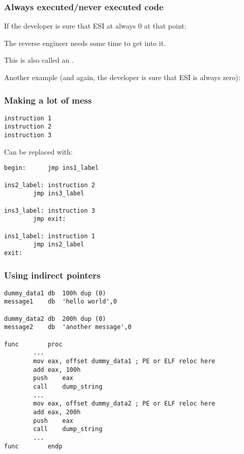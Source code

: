 \subsubsection{Always executed/never executed code}

If the developer is sure that ESI 
at always 0 at that point:



The reverse engineer needs some time to get into it.

This is also called an .

Another example (and again, the developer is sure that ESI is always zero):



\subsubsection{Making a lot of mess}

\begin{lstlisting}
instruction 1
instruction 2
instruction 3
\end{lstlisting}

Can be replaced with:

\begin{lstlisting}
begin:		jmp	ins1_label

ins2_label:	instruction 2
		jmp	ins3_label

ins3_label:	instruction 3
		jmp	exit:

ins1_label:	instruction 1
		jmp	ins2_label
exit:
\end{lstlisting}

\subsubsection{Using indirect pointers}

\begin{lstlisting}
dummy_data1	db	100h dup (0)
message1	db	'hello world',0

dummy_data2	db	200h dup (0)
message2	db	'another message',0

func		proc
		...
		mov	eax, offset dummy_data1 ; PE or ELF reloc here
		add	eax, 100h
		push	eax
		call	dump_string
		...
		mov	eax, offset dummy_data2 ; PE or ELF reloc here
		add	eax, 200h
		push	eax
		call	dump_string
		...
func		endp
\end{lstlisting}

